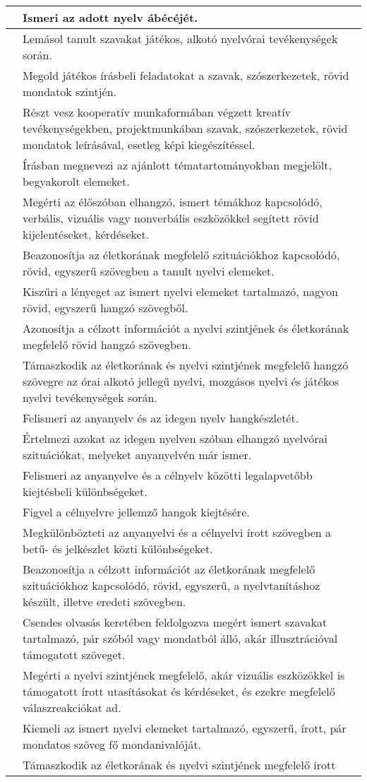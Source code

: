 \begin{longtable}[]{p{\evflength}@{\strut}>{\begin{minipage}{\columnlength}\strut}l<{\strut\end{minipage}}}
\hline
&
  Ismeri az adott nyelv ábécéjét.
\tabularnewline
\hline
&
  Lemásol tanult szavakat játékos, alkotó nyelvórai tevékenységek során.
\tabularnewline
\hline
&
  Megold játékos írásbeli feladatokat a szavak, szószerkezetek, rövid
  mondatok szintjén.
\tabularnewline
\hline
&
  Részt vesz kooperatív munkaformában végzett kreatív tevékenységekben,
  projektmunkában szavak, szószerkezetek, rövid mondatok leírásával,
  esetleg képi kiegészítéssel.
\tabularnewline
\hline
&
  Írásban megnevezi az ajánlott tématartományokban megjelölt,
  begyakorolt elemeket.
\tabularnewline
\hline
&
  Megérti az élőszóban elhangzó, ismert témákhoz kapcsolódó, verbális,
  vizuális vagy nonverbális eszközökkel segített rövid kijelentéseket,
  kérdéseket.
\tabularnewline
\hline
&
  Beazonosítja az életkorának megfelelő szituációkhoz kapcsolódó, rövid,
  egyszerű szövegben a tanult nyelvi elemeket.
\tabularnewline
\hline
&
  Kiszűri a lényeget az ismert nyelvi elemeket tartalmazó, nagyon rövid,
  egyszerű hangzó szövegből.
\tabularnewline
\hline
&
  Azonosítja a célzott információt a nyelvi szintjének és életkorának
  megfelelő rövid hangzó szövegben.
\tabularnewline
\hline
&
  Támaszkodik az életkorának és nyelvi szintjének megfelelő hangzó
  szövegre az órai alkotó jellegű nyelvi, mozgásos nyelvi és játékos
  nyelvi tevékenységek során.
\tabularnewline
\hline
&
  Felismeri az anyanyelv és az idegen nyelv hangkészletét.
\tabularnewline
\hline
&
  Értelmezi azokat az idegen nyelven szóban elhangzó nyelvórai
  szituációkat, melyeket anyanyelvén már ismer.
\tabularnewline
\hline
&
  Felismeri az anyanyelve és a célnyelv közötti legalapvetőbb
  kiejtésbeli különbségeket.
\tabularnewline
\hline
&
  Figyel a célnyelvre jellemző hangok kiejtésére.
\tabularnewline
\hline
&
  Megkülönbözteti az anyanyelvi és a célnyelvi írott szövegben a betű-
  és jelkészlet közti különbségeket.
\tabularnewline
\hline
&
  Beazonosítja a célzott információt az életkorának megfelelő
  szituációkhoz kapcsolódó, rövid, egyszerű, a nyelvtanításhoz készült,
  illetve eredeti szövegben.
\tabularnewline
\hline
&
  Csendes olvasás keretében feldolgozva megért ismert szavakat
  tartalmazó, pár szóból vagy mondatból álló, akár illusztrációval
  támogatott szöveget.
\tabularnewline
\hline
&
  Megérti a nyelvi szintjének megfelelő, akár vizuális eszközökkel is
  támogatott írott utasításokat és kérdéseket, és ezekre megfelelő
  válaszreakciókat ad.
\tabularnewline
\hline
&
  Kiemeli az ismert nyelvi elemeket tartalmazó, egyszerű, írott, pár
  mondatos szöveg fő mondanivalóját.
\tabularnewline
\hline
&
  Támaszkodik az életkorának és nyelvi szintjének megfelelő írott

\end{longtable}
